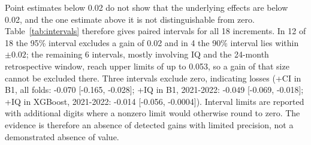 \documentclass[preprint,12pt,authoryear]{elsarticle}
\begin{document}
Point estimates below 0.02 do not show that the underlying effects are below 0.02, and the one estimate above it is not distinguishable from zero. Table~\ref{tab:intervals} therefore gives paired intervals for all 18 increments. In 12 of 18 the 95\% interval excludes a gain of 0.02 and in 4 the 90\% interval lies within $\pm 0.02$; the remaining 6 intervals, mostly involving IQ and the 24-month retrospective window, reach upper limits of up to 0.053, so a gain of that size cannot be excluded there. Three intervals exclude zero, indicating losses (+CI in B1, all folds: -0.070 [-0.165, -0.028]; +IQ in B1, 2021-2022: -0.049 [-0.069, -0.018]; +IQ in XGBoost, 2021-2022: -0.014 [-0.056, -0.0004]). Interval limits are reported with additional digits where a nonzero limit would otherwise round to zero. The evidence is therefore an absence of detected gains with limited precision, not a demonstrated absence of value.
\end{document}

